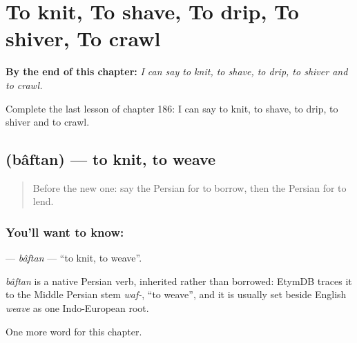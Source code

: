 
\chapter{To knit, To shave, To drip, To shiver, To crawl}
\label{ch:fa-to-knit-to-shave-to-drip-to-shiver-to-crawl}

\begin{chapteropening}
\textbf{By the end of this chapter:} \emph{I can say to knit, to shave, to drip, to shiver and to crawl.}

Complete the last lesson of chapter 186: I can say to knit, to shave, to drip, to shiver and to crawl.
\end{chapteropening}

\section[\texorpdfstring{\fa{بافتن} (bâftan)}{بافتن (bâftan)}]{ (bâftan) — to knit, to weave}

\label{lesson:FA-C186-baftan}



\begin{quote}
Before the new one: say the Persian for to borrow, then the Persian for to lend.
\end{quote}

\subsection*{You'll want to know: }
\textbf{} — \emph{bâftan} — \textquotedblleft{}to knit, to weave\textquotedblright{}.

\begin{cousinweb}
\emph{bâftan} is a native Persian verb, inherited rather than borrowed: EtymDB traces it to the Middle Persian stem \emph{waf-}, \textquotedblleft{}to weave\textquotedblright{}, and it is usually set beside English \emph{weave} as one Indo-European root.
\end{cousinweb}

\begin{grammarlens}[title={What you've built}]
One more word for this chapter.
\end{grammarlens}

